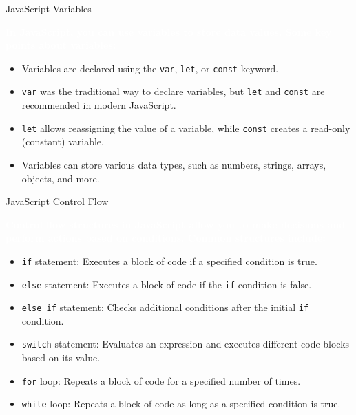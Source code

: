 \documentclass[aspectratio=169, table]{beamer}
\begin{document}
\begin{frame}{JavaScript Variables}
    \begin{tcolorbox}[standard jigsaw, opacityback=0, opacityframe=0, sharp corners, boxrule=0pt]
        \textbf{\textcolor{white}{In JavaScript, you can use variables to store data values. Some key points about variables:}}
        \begin{itemize}
            \item Variables are declared using the \texttt{var}, \texttt{let}, or \texttt{const} keyword.
            \item \texttt{var} was the traditional way to declare variables, but \texttt{let} and \texttt{const} are recommended in modern JavaScript.
            \item \texttt{let} allows reassigning the value of a variable, while \texttt{const} creates a read-only (constant) variable.
            \item Variables can store various data types, such as numbers, strings, arrays, objects, and more.
        \end{itemize}
    \end{tcolorbox}
\end{frame}

\begin{frame}{JavaScript Control Flow}
    \begin{tcolorbox}[standard jigsaw, opacityback=0, opacityframe=0, sharp corners, boxrule=0pt]
        \textbf{\textcolor{white}{Control flow structures in JavaScript allow you to make decisions and perform actions based on conditions. Common structures include:}}
        \begin{itemize}
            \item \texttt{if} statement: Executes a block of code if a specified condition is true.
            \item \texttt{else} statement: Executes a block of code if the \texttt{if} condition is false.
            \item \texttt{else if} statement: Checks additional conditions after the initial \texttt{if} condition.
            \item \texttt{switch} statement: Evaluates an expression and executes different code blocks based on its value.
            \item \texttt{for} loop: Repeats a block of code for a specified number of times.
            \item \texttt{while} loop: Repeats a block of code as long as a specified condition is true.
        \end{itemize}
    \end{tcolorbox}
\end{frame}
\end{document}
